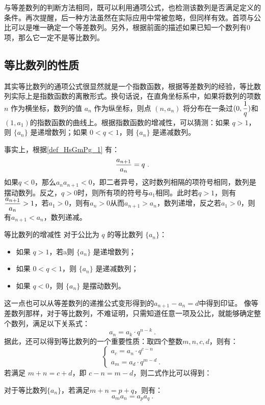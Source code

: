 与等差数列的判断方法相同，既可以利用通项公式，也检测该数列是否满足定义的条件。再次提醒，后一种方法虽然在实际应用中常被忽略，但同样有效。首项与公比可以是唯一确定一个等差数列。另外，根据前面的描述如果已知一个数列有$0$项，那么它一定不是等比数列。

\subsection{等比数列的性质}

其实等比数列的通项公式很显然就是一个指数函数，根据等差数列的经验，等比数列实际上是指数函数的离散形式。换句话说，在直角坐标系中，如果将数列的项数 $n$ 作为横坐标，数列的值 $a_n$ 作为纵坐标，则点 $(n, a_n)$ 将分布在一条过$\displaystyle(0,{1\over q})$和$(1,a_1)$的指数函数的曲线上。根据指数函数的增减性，可以猜测：如果 $q > 1$，则 $\{a_n\}$ 是递增数列；如果 $0< q < 1$，则 $\{a_n\}$ 是递减数列。

事实上，根据\autoref{def_HsGmPg_1} 有：
\begin{equation}
{a_{n+1}\over a_n}=q~.
\end{equation}
如果$q<0$，那么$a_na_{n+1}<0$，即二者异号，这时数列相隔的项符号相同，数列是摆动数列。反之，$q>0$时，则所有项的符号与$a_1$相同。此时若$q>1$，则有$\displaystyle{a_{n+1}\over a_n}>1$，若$a_1>0$，则有$a_n>0$从而$a_{n+1}>a_n$，数列递增，反之若$a_1>0$，则有$a_{n+1}<a_n$，数列递减。
\begin{corollary}{等比数列的增减性}
对于公比为 $q$ 的等比数列 $\{a_n\}$：
\begin{itemize}
\item 如果 $q > 1$，若a则 $\{a_n\}$ 是递增数列；
\item 如果 $0< q < 1$，则 $\{a_n\}$ 是递减数列；
\item 如果 $q<0$，则 $\{a_n\}$ 是摆动数列。
\end{itemize}
\end{corollary}

这一点也可以从等差数列的递推公式变形得到的$a_{n+1}-a_n=d$中得到印证。
像等差数列那样，对于等比数列，不难证明，只需知道任意一项及公比，就能够确定整个数列，满足以下关系式：
\begin{equation}
a_n=a_k\cdot q^{n-k}~.
\end{equation}
据此，还可以得到等比数列的一个重要性质：取四个整数$m,n,c,d$，则有：
\begin{equation}
\begin{cases}
a_c=a_n\cdot q^{c-n}\\
a_m=a_d\cdot q^{m-d}~.
\end{cases}
\end{equation}
若满足 $m+n=c+d$，即 $c-n=m-d$，则二式作比可以得到：
\begin{corollary}{}
对于等比数列$\{a_n\}$，若满足$m+n=p+q$，则有：
\begin{equation}
a_ma_n=a_pa_q~.
\end{equation}
\end{corollary}

